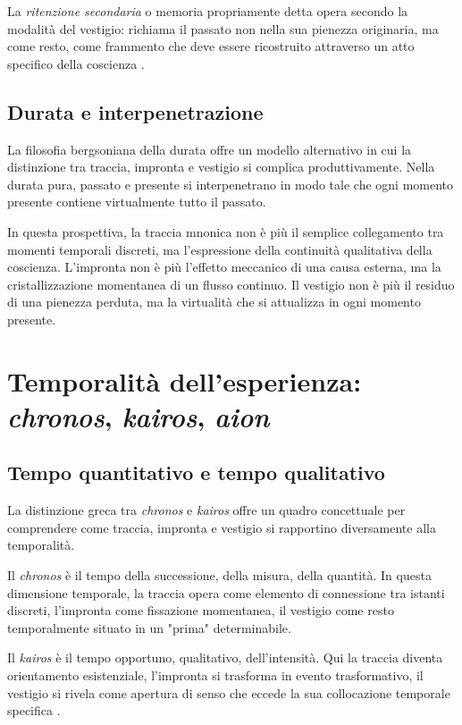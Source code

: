 \documentclass{gs}
\begin{document}
La \textit{ritenzione secondaria} o memoria propriamente detta opera secondo la modalità del vestigio: richiama il passato non nella sua pienezza originaria, ma come resto, come frammento che deve essere ricostruito attraverso un atto specifico della coscienza \cite{husserl1913}.

\subsection{Durata e interpenetrazione}

La filosofia bergsoniana della durata \cite{bergson1896} offre un modello alternativo in cui la distinzione tra traccia, impronta e vestigio si complica produttivamente. Nella durata pura, passato e presente si interpenetrano in modo tale che ogni momento presente contiene virtualmente tutto il passato.

In questa prospettiva, la traccia mnonica non è più il semplice collegamento tra momenti temporali discreti, ma l'espressione della continuità qualitativa della coscienza. L'impronta non è più l'effetto meccanico di una causa esterna, ma la cristallizzazione momentanea di un flusso continuo. Il vestigio non è più il residuo di una pienezza perduta, ma la virtualità che si attualizza in ogni momento presente.

\section{Temporalità dell'esperienza: \textit{chronos}, \textit{kairos}, \textit{aion}}

\subsection{Tempo quantitativo e tempo qualitativo}

La distinzione greca tra \textit{chronos} e \textit{kairos} offre un quadro concettuale per comprendere come traccia, impronta e vestigio si rapportino diversamente alla temporalità.

Il \textit{chronos} è il tempo della successione, della misura, della quantità. In questa dimensione temporale, la traccia opera come elemento di connessione tra istanti discreti, l'impronta come fissazione momentanea, il vestigio come resto temporalmente situato in un "prima" determinabile.

Il \textit{kairos} è il tempo opportuno, qualitativo, dell'intensità. Qui la traccia diventa orientamento esistenziale, l'impronta si trasforma in evento trasformativo, il vestigio si rivela come apertura di senso che eccede la sua collocazione temporale specifica \cite{agamben2000}.
\end{document}
